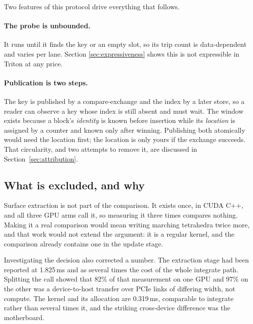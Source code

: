 \documentclass[11pt]{article}
\begin{document}
Two features of this protocol drive everything that follows.

\paragraph{The probe is unbounded.} It runs until it finds the key or an empty
slot, so its trip count is data-dependent and varies per lane. Section
\ref{sec:expressiveness} shows this is not expressible in Triton at any price.

\paragraph{Publication is two steps.} The key is published by a compare-exchange
and the index by a later store, so a reader can observe a key whose index is
still absent and must wait. The window exists because a block's \emph{identity}
is known before insertion while its \emph{location} is assigned by a counter and
known only after winning. Publishing both atomically would need the location
first; the location is only yours if the exchange succeeds. That circularity, and
two attempts to remove it, are discussed in Section~\ref{sec:attribution}.

\subsection{What is excluded, and why}

Surface extraction is not part of the comparison. It exists once, in CUDA C++,
and all three GPU arms call it, so measuring it three times compares nothing.
Making it a real comparison would mean writing marching tetrahedra twice more,
and that work would not extend the argument: it is a regular kernel, and the
comparison already contains one in the update stage.

Investigating the decision also corrected a number. The extraction stage had been
reported at 1.825\,ms and as several times the cost of the whole integrate path.
Splitting the call showed that 82\% of that measurement on one GPU and 97\% on the
other was a device-to-host transfer over PCIe links of differing width, not
compute. The kernel and its allocation are 0.319\,ms, comparable to integrate
rather than several times it, and the striking cross-device difference was the
motherboard.
\end{document}
